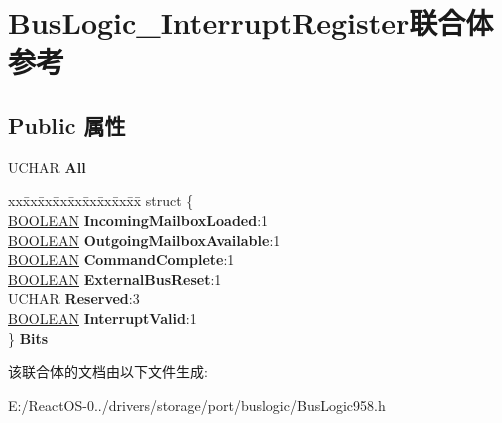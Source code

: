 \hypertarget{union_bus_logic___interrupt_register}{}\section{Bus\+Logic\+\_\+\+Interrupt\+Register联合体 参考}
\label{union_bus_logic___interrupt_register}
\subsection*{Public 属性}
\begin{DoxyCompactItemize}
\item 
\mbox{\label{union_bus_logic___interrupt_register_acbb2fe0a14a704c1ef8a7a3ec8bbcd56}} 
U\+C\+H\+AR {\bfseries All}
\item 
\mbox{\label{union_bus_logic___interrupt_register_a2057feaf395268e533b2ec059ea3c0c8}} 
\begin{tabbing}
xx\=xx\=xx\=xx\=xx\=xx\=xx\=xx\=xx\=\kill
struct \{\\
\>\hyperlink{_processor_bind_8h_a112e3146cb38b6ee95e64d85842e380a}{BOOLEAN} {\bfseries IncomingMailboxLoaded}:1\\
\>\hyperlink{_processor_bind_8h_a112e3146cb38b6ee95e64d85842e380a}{BOOLEAN} {\bfseries OutgoingMailboxAvailable}:1\\
\>\hyperlink{_processor_bind_8h_a112e3146cb38b6ee95e64d85842e380a}{BOOLEAN} {\bfseries CommandComplete}:1\\
\>\hyperlink{_processor_bind_8h_a112e3146cb38b6ee95e64d85842e380a}{BOOLEAN} {\bfseries ExternalBusReset}:1\\
\>UCHAR {\bfseries Reserved}:3\\
\>\hyperlink{_processor_bind_8h_a112e3146cb38b6ee95e64d85842e380a}{BOOLEAN} {\bfseries InterruptValid}:1\\
\} {\bfseries Bits}\\

\end{tabbing}\end{DoxyCompactItemize}


该联合体的文档由以下文件生成\+:\begin{DoxyCompactItemize}
\item 
E\+:/\+React\+O\+S-\/0../drivers/storage/port/buslogic/Bus\+Logic958.\+h\end{DoxyCompactItemize}
